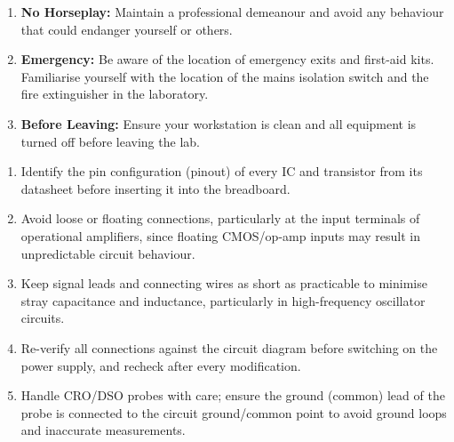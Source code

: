 \begin{safetybox}
\begin{enumerate}[label=\arabic*.]
		the lab instructor or faculty-in-charge or TA.
		\item \textbf{No Horseplay:} Maintain a professional demeanour and avoid any behaviour that could
		endanger yourself or others.
		\item \textbf{Emergency:} Be aware of the location of emergency exits and first-aid kits. Familiarise yourself with the location of the mains isolation switch and the fire extinguisher in the laboratory.
		\item \textbf{Before Leaving:} Ensure your workstation is clean and all equipment is turned off before
		leaving the lab.
	\end{enumerate}
\end{safetybox}

\begin{precautionbox}
	\begin{enumerate}[label=\arabic*.]
		\item Identify the pin configuration (pinout) of every IC and transistor from its datasheet before inserting it into the breadboard.
		\item Avoid loose or floating connections, particularly at the input terminals of operational amplifiers, since floating CMOS/op-amp inputs may result in unpredictable circuit behaviour.
		\item Keep signal leads and connecting wires as short as practicable to minimise stray capacitance and inductance, particularly in high-frequency oscillator circuits.
		\item Re-verify all connections against the circuit diagram before switching on the power supply, and recheck after every modification.
		\item Handle CRO/DSO probes with care; ensure the ground (common) lead of the probe is connected to the circuit ground/common point to avoid ground loops and inaccurate measurements.
	\end{enumerate}
\end{precautionbox}